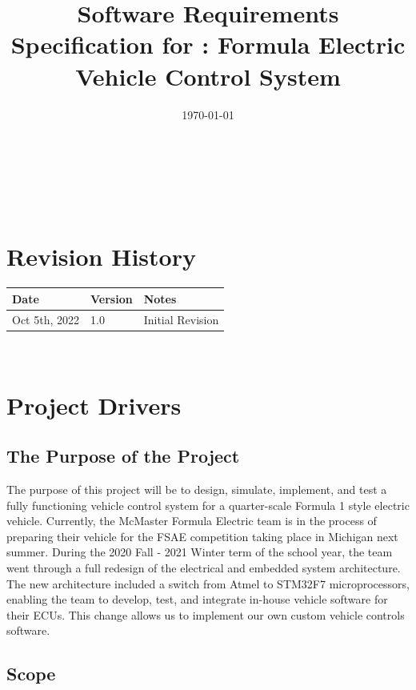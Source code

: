 \documentclass[12pt]{article}
\begin{document}
\title{Software Requirements Specification for \progname: \bf Formula Electric Vehicle Control System} 
\author{\authname}
\date{\today}
	
\maketitle

~\newpage


\tableofcontents

~\newpage

\section*{Revision History}

\begin{tabularx}{\textwidth}{p{3cm}p{2cm}X}
\toprule {\bf Date} & {\bf Version} & {\bf Notes}\\
\midrule
Oct 5th, 2022 & 1.0 & Initial Revision\\
\bottomrule
\end{tabularx}

~\newpage

\section{Project Drivers}

\subsection{The Purpose of the Project}

The purpose of this project will be to design, simulate, implement, and test a fully functioning vehicle control system 
for a quarter-scale Formula 1 style electric vehicle.
Currently, the McMaster Formula Electric team is in the process of preparing their vehicle for the FSAE competition taking 
place in Michigan next summer. During the 2020 Fall - 2021 Winter term of the school year, the team went through a full redesign of the
electrical and embedded system architecture. The new architecture included a switch from Atmel to STM32F7 microprocessors, enabling the team to develop, test, and 
integrate in-house vehicle software for their ECUs. This change allows us to implement our own custom vehicle controls software.

\subsection{Scope}
\end{document}
